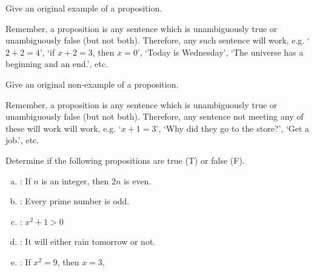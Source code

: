 \documentclass[11pt,letterpaper]{article}
\begin{document}
 Give an original example of a proposition.

\sol Remember, a proposition is any sentence which is unambiguously true or unambiguously false (but not both). Therefore, any such sentence will work, e.g. `$2 + 2= 4$', `if $x + 2= 3$, then $x= 0$', `Today is Wednesday', `The universe has a beginning and an end.', etc. 



\newpage



 Give an original non-example of a proposition.

\sol Remember, a proposition is any sentence which is unambiguously true or unambiguously false (but not both). Therefore, any sentence not meeting any of these will work will work, e.g. `$x + 1= 3$', `Why did they go to the store?', `Get a job.', etc. 



\newpage



 Determine if the following propositions are true (T) or false (F). 
	\begin{enumerate}[(a),topsep=0pt]
	\item {}: If $n$ is an integer, then $2n$ is even.
	\item {}: Every prime number is odd.
	\item {}: $x^2 + 1 > 0$
	\item {}: It will either rain tomorrow or not.
	\item {}: If $x^2= 9$, then $x= 3$,
	\end{enumerate}
\end{document}
